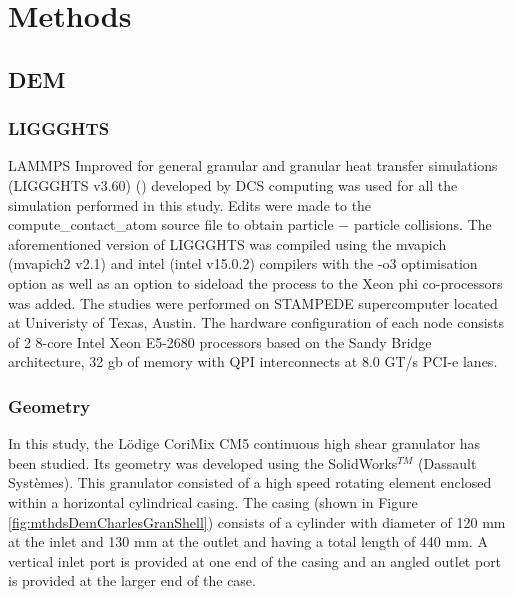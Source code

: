 \documentclass[preprint,11pt,authoryear]{elsarticle}
\begin{document}
\section{Methods}

\subsection{DEM}
\subsubsection{LIGGGHTS}
\par LAMMPS Improved for general granular and granular heat transfer simulations (LIGGGHTS v3.60) (\cite{Kloss2012}) developed by DCS computing was used for all the simulation performed in this study. Edits were made to the compute\_contact\_atom source file to obtain particle $-$ particle collisions. The aforementioned version of LIGGGHTS was compiled using the mvapich (mvapich2 v2.1) and intel (intel v15.0.2) compilers with the -o3 optimisation option as well as an option to sideload the process to the Xeon phi co-processors was added. The studies were performed on STAMPEDE supercomputer located at Univeristy of Texas, Austin. The hardware configuration of each node consists of 2 8-core Intel Xeon E5-2680 processors based on the Sandy Bridge architecture, 32 gb of memory with QPI interconnects at 8.0 GT/s PCI-e lanes.


\subsubsection{Geometry}    

\par In this study, the L\"{o}dige CoriMix CM5 continuous high shear granulator has been studied. Its geometry was developed using the SolidWorks$^{TM}$ (Dassault Syst\`{e}mes). This granulator consisted of a high speed rotating element enclosed within a horizontal cylindrical casing. The casing (shown in Figure \ref{fig:mthdsDemCharlesGranShell}) consists of a cylinder with diameter of 120 mm at the inlet and 130 mm at the outlet and having a total length of 440 mm. A vertical inlet port is provided at one end of the casing and an angled outlet port is provided at the larger end of the case. 
\end{document}
